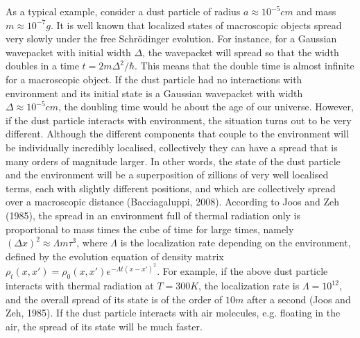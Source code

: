 As a typical example, consider a dust particle of radius $a \approx 10^{-5}cm$ and mass $m \approx 10^{-7}g$. It is well known that localized states of macroscopic objects spread very slowly under the free Schr\"{o}dinger evolution. For instance, for a Gaussian wavepacket with initial width $\Delta$, the wavepacket will spread so that the width doubles in a time $t=2m \Delta^2 / \hbar $. This means that the double time is almost infinite for a macroscopic object. If the dust particle had no interactions with environment and its initial state is a Gaussian wavepacket with width $\Delta \approx 10^{-5}cm$, the doubling time would be about the age of our universe. However, if the dust particle interacts with environment, the situation turns out to be very different. Although the different components that couple to the environment will be individually incredibly localised, collectively they can have a spread that is many orders of magnitude larger. In other words, the state of the dust particle and the environment will be a superposition of zillions of very well localised terms, each with slightly different positions, and which are collectively spread over a macroscopic distance (Bacciagaluppi, 2008). According to Joos and Zeh (1985), the spread in an environment full of thermal radiation only is proportional to mass times the cube of time for large times, namely $(\Delta x) ^2 \approx \Lambda m\tau^3$, where $\Lambda$ is the localization rate depending on the environment, defined by the evolution equation of density matrix $\rho_t(x,x')=\rho_0(x,x')e^{-\Lambda t (x-x')^2}$. For example, if the above dust particle interacts with thermal radiation at $T=300K$, the localization rate is $\Lambda = 10^{12}$, and the overall spread of its state is of the order of $10m$ after a second (Joos and Zeh, 1985). If the dust particle interacts with air molecules, e.g. floating in the air, the spread of its state will be much faster. 

